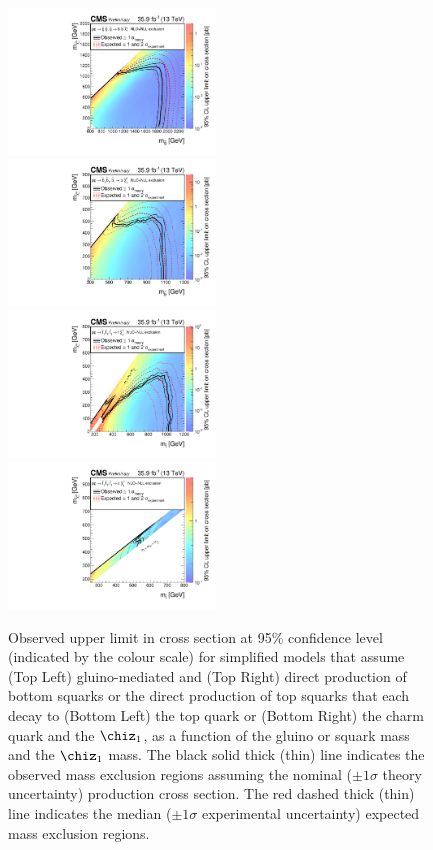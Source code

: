 \begin{figure}[!tb]
  \centering
  \includegraphics[width=0.49\textwidth]{figures/T1bbbbXSEC.pdf} ~
  \includegraphics[width=0.49\textwidth]{figures/T2bbXSEC.pdf} \\
  \includegraphics[width=0.49\textwidth]{figures/T2ttXSEC.pdf} ~
  \includegraphics[width=0.49\textwidth]{figures/T2ccXSEC.pdf} 
  \caption{Observed upper limit in cross section at 95\% confidence
    level (indicated by the colour scale) for simplified models that
    assume (Top Left) gluino-mediated and (Top Right) direct
    production of bottom squarks or the direct production of top
    squarks that each decay to (Bottom Left) the top quark or
    (Bottom Right) the charm quark and the $\chiz_{1}$, as a
    function of the gluino or squark mass and the $\chiz_{1}$ 
    mass. The black solid thick (thin) line indicates the observed
    mass exclusion regions assuming the nominal (${\pm}1 \sigma$
    theory uncertainty) production cross section. The red dashed
    thick (thin) line indicates the median (${\pm}1 \sigma$
    experimental uncertainty) expected mass exclusion
    regions. 
  }
  \label{fig:limits-sms} 
  \centering
\end{figure}

